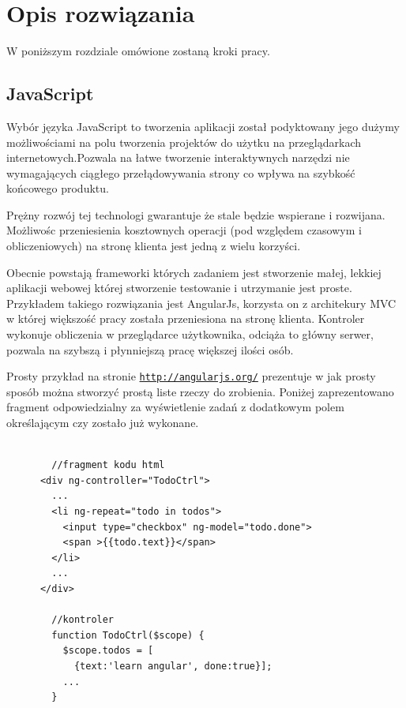 \chapter{Opis rozwiązania}
\label{cha:Opis rozwiązania}

W poniższym rozdziale omówione zostaną kroki pracy.

\section{JavaScript}
\label{sec:javascript}

Wybór języka JavaScript to tworzenia aplikacji został podyktowany jego dużymy możliwościami na polu tworzenia projektów do użytku na przeglądarkach internetowych.Pozwala na łatwe tworzenie interaktywnych narzędzi nie wymagających ciągłego przełądowywania strony co wpływa na szybkość końcowego produktu.

Prężny rozwój tej technologi gwarantuje że stale będzie wspierane i rozwijana. Możliwośc przeniesienia kosztownych operacji (pod względem czasowym i obliczeniowych) na stronę klienta jest jedną z wielu korzyści.

Obecnie powstają frameworki których zadaniem jest stworzenie małej, lekkiej aplikacji webowej której stworzenie testowanie i utrzymanie jest proste.\cite{AngularJS} Przykładem takiego rozwiązania jest AngularJs, korzysta on z architekury MVC w której większość pracy została przeniesiona na stronę klienta. Kontroler wykonuje obliczenia w przeglądarce użytkownika, odciąża to główny serwer, pozwala na szybszą i płynniejszą pracę większej ilości osób.

Prosty przykład na stronie \underline{\texttt{http://angularjs.org/}} prezentuje w jak prosty sposób można stworzyć prostą liste rzeczy do zrobienia. Poniżej zaprezentowano fragment odpowiedzialny za wyświetlenie zadań z dodatkowym polem określającym czy zostało już wykonane.

\lstset{language=JavaScript}
\begin{lstlisting}[caption=AngularJs]

        //fragment kodu html
      <div ng-controller="TodoCtrl">
        ...
        <li ng-repeat="todo in todos">
          <input type="checkbox" ng-model="todo.done">
          <span >{{todo.text}}</span>
        </li>
        ...
      </div>

        //kontroler
        function TodoCtrl($scope) {
          $scope.todos = [
            {text:'learn angular', done:true}];
          ...
        }
\end{lstlisting}


